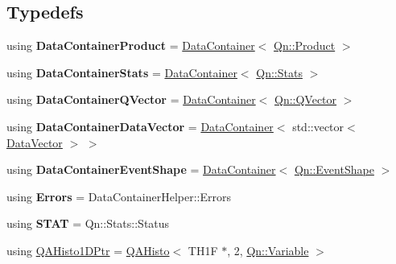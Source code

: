 \subsection*{Typedefs}
\begin{DoxyCompactItemize}
\item 
\mbox{\label{namespaceQn_a662bba477bcaaf493b8c256ae83f3bd0}} 
using {\bfseries Data\+Container\+Product} = \mbox{\hyperlink{classQn_1_1DataContainer}{Data\+Container}}$<$ \mbox{\hyperlink{structQn_1_1Product}{Qn\+::\+Product}} $>$
\item 
\mbox{\label{namespaceQn_a4cb7a83e7c7f8da0855015d39b39504d}} 
using {\bfseries Data\+Container\+Stats} = \mbox{\hyperlink{classQn_1_1DataContainer}{Data\+Container}}$<$ \mbox{\hyperlink{classQn_1_1Stats}{Qn\+::\+Stats}} $>$
\item 
\mbox{\label{namespaceQn_ae1c78fa8127db42765f1cd0158dcda45}} 
using {\bfseries Data\+Container\+Q\+Vector} = \mbox{\hyperlink{classQn_1_1DataContainer}{Data\+Container}}$<$ \mbox{\hyperlink{classQn_1_1QVector}{Qn\+::\+Q\+Vector}} $>$
\item 
\mbox{\label{namespaceQn_a8b42bca2cc02ec851b2894d4c431f016}} 
using {\bfseries Data\+Container\+Data\+Vector} = \mbox{\hyperlink{classQn_1_1DataContainer}{Data\+Container}}$<$ std\+::vector$<$ \mbox{\hyperlink{structQn_1_1DataVector}{Data\+Vector}} $>$ $>$
\item 
\mbox{\label{namespaceQn_a261ad9fb2337921a82165a31e879a1cb}} 
using {\bfseries Data\+Container\+Event\+Shape} = \mbox{\hyperlink{classQn_1_1DataContainer}{Data\+Container}}$<$ \mbox{\hyperlink{classQn_1_1EventShape}{Qn\+::\+Event\+Shape}} $>$
\item 
\mbox{\label{namespaceQn_a403dc3d02d925c48c906585e40cd252a}} 
using {\bfseries Errors} = Data\+Container\+Helper\+::\+Errors
\item 
\mbox{\label{namespaceQn_ada06f6b955d012df2ae92b22d95ba046}} 
using {\bfseries S\+T\+AT} = Qn\+::\+Stats\+::\+Status
\item 
\mbox{\label{namespaceQn_acc47770a375100ee73a2a09b37705186}} 
using \mbox{\hyperlink{namespaceQn_acc47770a375100ee73a2a09b37705186}{Q\+A\+Histo1\+D\+Ptr}} = \mbox{\hyperlink{classQn_1_1QAHisto}{Q\+A\+Histo}}$<$ T\+H1F $\ast$, 2, \mbox{\hyperlink{classQn_1_1Variable}{Qn\+::\+Variable}} $>$

\end{DoxyCompactItemize}
